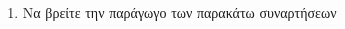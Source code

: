 \begin{enumerate}
\item Να βρείτε την παράγωγο των παρακάτω συναρτήσεων
\begin{multicols}{2}
\end{multicols}



\end{enumerate}